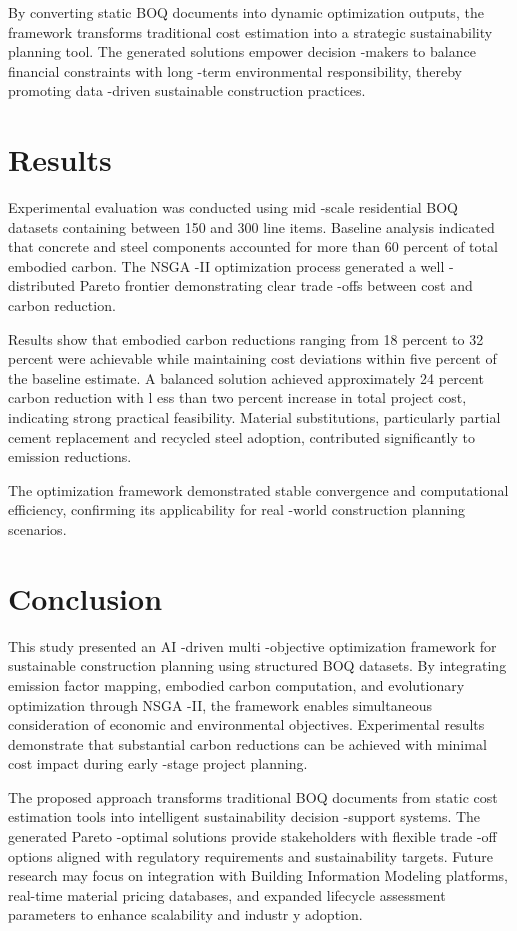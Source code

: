 \documentclass[10pt,twocolumn]{article}
\begin{document}
By converting static BOQ documents into dynamic optimization outputs, the framework transforms 
traditional cost estimation into a strategic sustainability planning tool. The generated solutions 
empower decision -makers to balance financial constraints with long -term environmental 
responsibility, thereby promoting data -driven sustainable construction practices.

\section{Results}
Experimental evaluation was conducted using mid -scale residential BOQ datasets containing
between 150 and 300 line items. Baseline analysis indicated that concrete and steel components 
accounted for more than 60 percent of total embodied carbon. The NSGA -II optimization process 
generated a well -distributed Pareto frontier demonstrating clear trade -offs between cost and carbon 
reduction.  
 
Results show that embodied carbon reductions ranging from 18 percent to 32 percent were 
achievable while maintaining cost deviations within five percent of the baseline estimate. A balanced 
solution achieved approximately 24 percent carbon reduction with l ess than two percent increase in 
total project cost, indicating strong practical feasibility. Material substitutions, particularly partial 
cement replacement and recycled steel adoption, contributed significantly to emission reductions.  
 
The optimization framework demonstrated stable convergence and computational efficiency, 
confirming its applicability for real -world construction planning scenarios.

\section{Conclusion}
This study presented an AI -driven multi -objective optimization framework for sustainable
construction planning using structured BOQ datasets. By integrating emission factor mapping, 
embodied carbon computation, and evolutionary optimization through NSGA -II, the framework 
enables simultaneous consideration of economic and environmental objectives. Experimental results 
demonstrate that substantial carbon reductions can be achieved with minimal cost impact during 
early -stage project planning.  
 
The proposed approach transforms traditional BOQ documents from static cost estimation tools into 
intelligent sustainability decision -support systems. The generated Pareto -optimal solutions provide 
stakeholders with flexible trade -off options aligned with regulatory requirements and sustainability 
targets. Future research may focus on integration with Building Information Modeling platforms, 
real-time material pricing databases, and expanded lifecycle assessment parameters to enhance 
scalability and industr y adoption.
\end{document}
